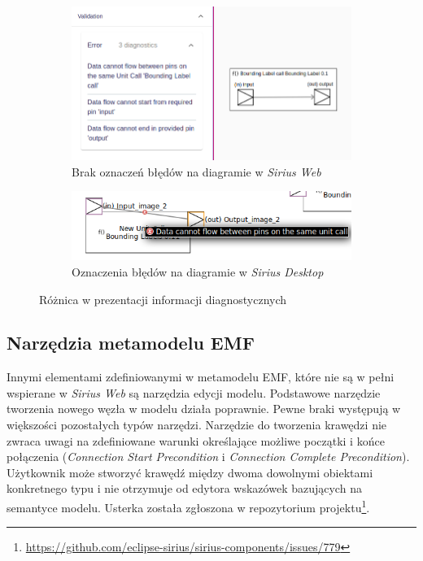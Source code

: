 \begin{figure}
	\centering
	\begin{subfigure}{.49\textwidth}
		\centering
		\includegraphics[width=.99\linewidth]{./images/sirius-web-semantic-validation-direction-and-no-loops-rules.png}
		\caption{Brak oznaczeń błędów na diagramie w \emph{Sirius
      Web}}\label{rys:validation-comparison-sirius-web}
	\end{subfigure}
  \begin{subfigure}{.49\textwidth}
		\centering
		\includegraphics[width=.99\linewidth]{./images/sirius-desktop-example-semantic-validation-rule-failure.png}
		\caption{Oznaczenia błędów na diagramie w \emph{Sirius
      Desktop}}\label{rys:validation-comparison-sirius-desktop}
	\end{subfigure}

	\caption{Różnica w prezentacji informacji diagnostycznych}
\end{figure}

\subsection{Narzędzia metamodelu EMF}

Innymi elementami zdefiniowanymi w metamodelu \gls{EMF}, które nie są w pełni
wspierane w \emph{Sirius Web} są narzędzia edycji modelu. Podstawowe narzędzie
tworzenia nowego węzła w modelu działa poprawnie.
Pewne braki występują w większości pozostałych typów narzędzi. Narzędzie do
tworzenia krawędzi nie zwraca uwagi na zdefiniowane warunki określające możliwe
początki i końce połączenia (\emph{Connection Start Precondition} i
\emph{Connection Complete Precondition}). Użytkownik może stworzyć krawędź
między dwoma dowolnymi obiektami konkretnego typu i nie otrzymuje od edytora
wskazówek bazujących na semantyce modelu. Usterka została zgłoszona w
repozytorium projektu\footnote{
	\url{https://github.com/eclipse-sirius/sirius-components/issues/779}}.

